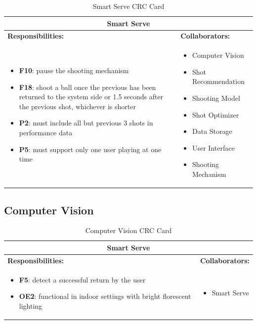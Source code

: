 \documentclass[11pt]{article}
\begin{document}
\begin{table}[H]
\centering
\label{my-label}
\begin{tabular}{ | p{} | p{} | }
\hline
\multicolumn{2}{|c|}{\textbf{Smart Serve}}             \\ \hline
\textbf{Responsibilities:} & \textbf{Collaborators:} \\ \hline
\begin{itemize} 
\item \textbf{F10}: pause the shooting mechanism
\item \textbf{F18}: shoot a ball once the previous has been returned to the system side or 1.5 seconds after the previous shot, whichever is shorter
\item \textbf{P2}:  must include all but previous 3 shots in performance data
\item \textbf{P5}: must support only one user playing at one time
\end{itemize} 
& 
\begin{itemize} 
\item Computer Vision
\item Shot Recommendation
\item Shooting Model
\item Shot Optimizer
\item Data Storage
\item User Interface
\item Shooting Mechanism
\end{itemize} \\ \hline
\end{tabular}
\caption{Smart Serve CRC Card}
\end{table}

\subsection{Computer Vision}

\begin{table}[H]
\centering
\label{my-label}
\begin{tabular}{ | p{} | p{} | }
\hline
\multicolumn{2}{|c|}{\textbf{Smart Serve}}             \\ \hline
\textbf{Responsibilities:} & \textbf{Collaborators:} \\ \hline
\begin{itemize}
\item \textbf{F5}: detect a successful return by the user
\item \textbf{OE2}: functional in indoor settings with bright florescent lighting
\end{itemize} 
& 
\begin{itemize} \item Smart Serve
\end{itemize} \\ \hline
\end{tabular}
\caption{Computer Vision CRC Card}
\end{table}
\end{document}
